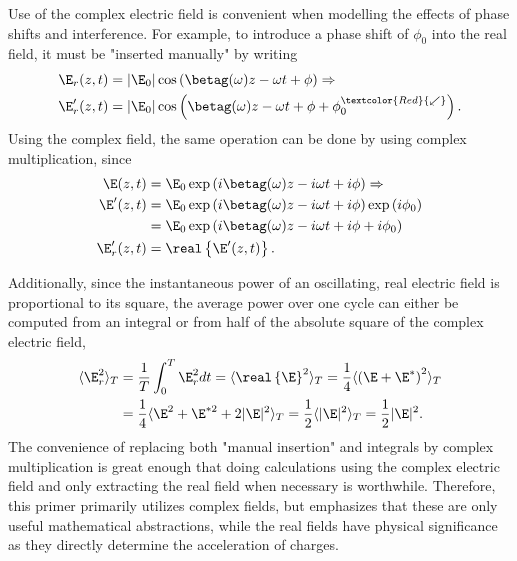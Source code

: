 Use of the complex electric field is convenient when modelling the effects of phase shifts and interference. For example, to introduce a phase shift of $\phi_0$ into the real field, it must be "inserted manually" by writing
\begin{align}
\label{eq:insert_phase}
    \E_r(z,t) &= |\E_0|\cos\left(\betag(\omega)z-\omega t+\phi\right) \Rightarrow \\ \nonumber \E_r'(z,t) &= |\E_0|\cos\left(\betag(\omega)z-\omega t+\phi+\phi_0^{\textcolor{Red}{\swarrow}}\right).   
\end{align}
Using the complex field, the same operation can be done by using complex multiplication, since
\begin{align}
\label{eq:insert_phase_complex}
    \E(z,t) &=\E_0 \exp\left( i\betag(\omega)z-i\omega t+ i\phi\right)\Rightarrow \\ \nonumber \E'(z,t) &=  \E_0 \exp\left( i\betag(\omega)z-i\omega t +i\phi\right)\exp\left( i\phi_0\right) \\ \nonumber
    &=\E_0 \exp\left( i\betag(\omega)z-i\omega t +i\phi+ i\phi_0\right) \\ \nonumber
    \E_r'(z,t) &= \real\left\{  \E'(z,t)   \right\}. 
\end{align}

Additionally, since the instantaneous power of an oscillating, real electric field is proportional to its square, the average power over one cycle can either be computed from an integral or from half of the absolute square of the complex electric field,
\begin{align}
\label{eq:average_power}
    \langle \E_r^2 \rangle_T&= \frac{1}{T}\int_{0}^{T} \E_r^2 dt = \langle\real\left\{\E\right\}^2\rangle_T =\frac{1}{4}\langle\left(\E+\E^*\right)^2\rangle_T\\ \nonumber
&=\frac{1}{4}\langle \E^2+\E^{*2}+2|\E|^2 \rangle_T=\frac{1}{2} \langle|\E|^2\rangle_T=\frac{1}{2}|\E|^2.
\end{align}
The convenience of replacing both "manual insertion" and integrals by complex multiplication is great enough that doing calculations using the complex electric field and only extracting the real field when necessary is worthwhile. Therefore, this primer primarily utilizes complex fields, but emphasizes that these are only useful mathematical abstractions, while the real fields have physical significance as they directly determine the acceleration of charges.  

